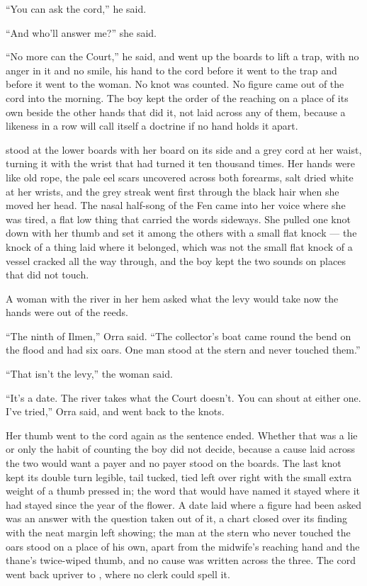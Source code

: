 “You can ask the cord,” he said.

“And who'll answer me?” she said.

“No more can the Court,” he said, and went up the boards to lift a trap, with no anger in it and no smile, his hand to the cord before it went to the trap and before it went to the woman. No knot was counted. No figure came out of the cord into the morning. The boy kept the order of the reaching on a place of its own beside the other hands that did it, not laid across any of them, because a likeness in a row will call itself a doctrine if no hand holds it apart.

 stood at the lower boards with her board on its side and a grey cord at her waist, turning it with the wrist that had turned it ten thousand times. Her hands were like old rope, the pale eel scars uncovered across both forearms, salt dried white at her wrists, and the grey streak went first through the black hair when she moved her head. The nasal half-song of the Fen came into her voice where she was tired, a flat low thing that carried the words sideways. She pulled one knot down with her thumb and set it among the others with a small flat knock --- the knock of a thing laid where it belonged, which was not the small flat knock of a vessel cracked all the way through, and the boy kept the two sounds on places that did not touch.

A woman with the river in her hem asked what the levy would take now the hands were out of the reeds.

“The ninth of Ilmen,” Orra said. “The collector's boat came round the bend on the flood and had six oars. One man stood at the stern and never touched them.”

“That isn't the levy,” the woman said.

“It's a date. The river takes what the Court doesn't. You can shout at either one. I've tried,” Orra said, and went back to the knots.

Her thumb went to the cord again as the sentence ended. Whether that was a lie or only the habit of counting the boy did not decide, because a cause laid across the two would want a payer and no payer stood on the boards. The last knot kept its double turn legible, tail tucked, tied left over right with the small extra weight of a thumb pressed in; the word that would have named it stayed where it had stayed since the year of the flower. A date laid where a figure had been asked was an answer with the question taken out of it, a chart closed over its finding with the neat margin left showing; the man at the stern who never touched the oars stood on a place of his own, apart from the midwife's reaching hand and the thane's twice-wiped thumb, and no cause was written across the three. The cord went back upriver to , where no clerk could spell it.


